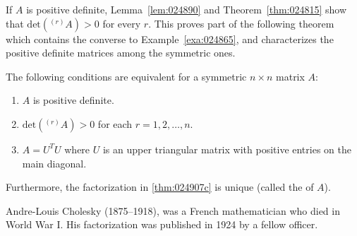 \documentclass{ximera}
\begin{document}
If $A$ is positive definite, Lemma~\ref{lem:024890} and Theorem~\ref{thm:024815} show that $\mbox{det}(^{(r)}A) > 0$ for every $r$. This proves part of the following theorem which contains the converse to Example~\ref{exa:024865}, and characterizes the positive definite matrices among the symmetric ones.


\begin{theorem}\label{thm:024907}
The following conditions are equivalent for a symmetric $n \times n$ matrix $A$:

\begin{enumerate}
\item\label{thm:024907a} $A$ is positive definite.

\item\label{thm:024907b} $\mbox{det}(^{(r)}A) > 0$ for each $r = 1, 2, \dots, n$.

\item\label{thm:024907c} $A = U^{T}U$ where $U$ is an upper triangular matrix with positive entries on the main diagonal.
\end{enumerate}

Furthermore, the factorization in \ref{thm:024907c} is unique (called the  of $A$).
\end{theorem}
\begin{remark}
    Andre-Louis
 Cholesky (1875--1918), was a French mathematician who died in World War
I. His factorization was published in 1924 by a fellow officer.
\end{remark}
\end{document}
